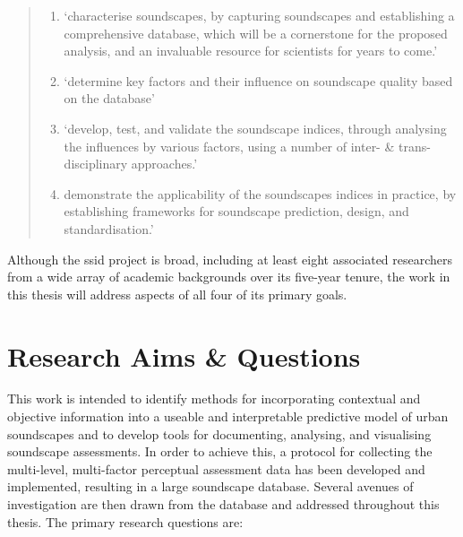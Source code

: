 \begin{quote}
\begin{enumerate}
  \item `characterise soundscapes, by capturing soundscapes and establishing a comprehensive database, which will be a cornerstone for the proposed analysis, and an invaluable resource for scientists for years to come.'
  \item `determine key factors and their influence on soundscape quality based on the database'
  \item `develop, test, and validate the soundscape indices, through analysing the influences by various factors, using a number of inter- \& trans-disciplinary approaches.'
  \item demonstrate the applicability of the soundscapes indices in practice, by establishing frameworks for soundscape prediction, design, and standardisation.'
\end{enumerate}
\end{quote}

Although the \gls{ssid} project is broad, including at least eight associated researchers from a wide array of academic backgrounds over its five-year tenure, the work in this thesis will address aspects of all four of its primary goals. 

\section{Research Aims \& Questions}
This work is intended to identify methods for incorporating contextual and objective information into a useable and interpretable predictive model of urban soundscapes and to develop tools for documenting, analysing, and visualising soundscape assessments. In order to achieve this, a protocol for collecting the multi-level, multi-factor perceptual assessment data has been developed and implemented, resulting in a large soundscape database. Several avenues of investigation are then drawn from the database and addressed throughout this thesis. The primary research questions are:

